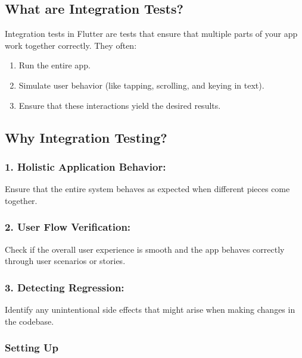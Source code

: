 \documentclass[
]{article}
\providecommand{\tightlist}{%
  \setlength{\itemsep}{0pt}\setlength{\parskip}{0pt}}
\begin{document}
\subsection{What are Integration
Tests?}\label{what-are-integration-tests}

Integration tests in Flutter are tests that ensure that multiple parts
of your app work together correctly. They often:

\begin{enumerate}
\def\labelenumi{\arabic{enumi}.}
\tightlist
\item
  Run the entire app.
\item
  Simulate user behavior (like tapping, scrolling, and keying in text).
\item
  Ensure that these interactions yield the desired results.
\end{enumerate}

\subsection{Why Integration Testing?}\label{why-integration-testing}

\subsubsection{1. Holistic Application
Behavior:}\label{holistic-application-behavior}

Ensure that the entire system behaves as expected when different pieces
come together.

\subsubsection{2. User Flow Verification:}\label{user-flow-verification}

Check if the overall user experience is smooth and the app behaves
correctly through user scenarios or stories.

\subsubsection{3. Detecting Regression:}\label{detecting-regression}

Identify any unintentional side effects that might arise when making
changes in the codebase.

\subsubsection{Setting Up}\label{setting-up-1}
\end{document}
